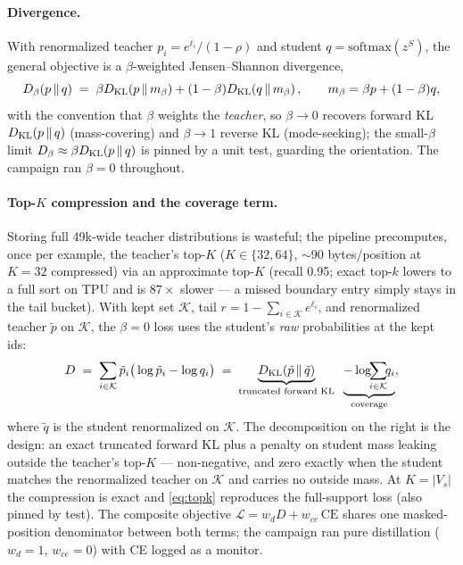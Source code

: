 \paragraph{Divergence.} With renormalized teacher
$p_i = e^{\ell_i}/(1-\rho)$ and student $q = \mathrm{softmax}(z^{S})$,
the general objective is a $\beta$-weighted Jensen--Shannon divergence,
\begin{equation}
D_\beta(p \,\|\, q) \;=\; \beta D_{\mathrm{KL}}\!\left(p \,\middle\|\, m_\beta\right) + (1-\beta)D_{\mathrm{KL}}\!\left(q \,\middle\|\, m_\beta\right),
\qquad m_\beta = \beta p + (1-\beta) q,
\label{eq:jsd}
\end{equation}
with the convention that $\beta$ weights the \emph{teacher}, so
$\beta \to 0$ recovers forward KL $D_{\mathrm{KL}}\!\left(p \,\middle\|\, q\right)$ (mass-covering) and
$\beta \to 1$ reverse KL (mode-seeking); the small-$\beta$ limit
$D_\beta \approx \beta D_{\mathrm{KL}}\!\left(p \,\middle\|\, q\right)$ is pinned by a unit test, guarding the
orientation. The campaign ran $\beta = 0$ throughout.

\paragraph{Top-$K$ compression and the coverage term.} Storing full
49k-wide teacher distributions is wasteful; the pipeline precomputes,
once per example, the teacher's top-$K$ ($K \in \{32, 64\}$,
$\sim$90 bytes/position at $K{=}32$ compressed) via an approximate
top-$K$ (recall 0.95; exact top-$k$ lowers to a full sort on TPU and is
$87\times$ slower --- a missed boundary entry simply stays in the tail
bucket). With kept set $\mathcal{K}$, tail $r = 1 - \sum_{i \in
\mathcal{K}} e^{\ell_i}$, and renormalized teacher $\tilde{p}$ on
$\mathcal{K}$, the $\beta{=}0$ loss uses the student's \emph{raw}
probabilities at the kept ids:
\begin{equation}
D \;=\; \sum_{i \in \mathcal{K}} \tilde{p}_i
\big(\log \tilde{p}_i - \log q_i\big)
\;=\;
\underbrace{D_{\mathrm{KL}}\!\left(\tilde{p} \,\middle\|\, \tilde{q}\right)}_{\text{truncated forward KL}}
\;\; \underbrace{- \log\!\!\sum_{i \in \mathcal{K}}\!\! q_i}_{\text{coverage}},
\label{eq:topk}
\end{equation}
where $\tilde{q}$ is the student renormalized on $\mathcal{K}$. The
decomposition on the right is the design: an exact truncated forward KL
plus a penalty on student mass leaking outside the teacher's top-$K$
--- non-negative, and zero exactly when the student matches the
renormalized teacher on $\mathcal{K}$ and carries no outside mass. At
$K = |V_s|$ the compression is exact and \eqref{eq:topk} reproduces the
full-support loss (also pinned by test). The composite objective
$\mathcal{L} = w_d D + w_{ce}\,\mathrm{CE}$ shares one masked-position
denominator between both terms; the campaign ran pure distillation
($w_d = 1$, $w_{ce} = 0$) with CE logged as a monitor.


